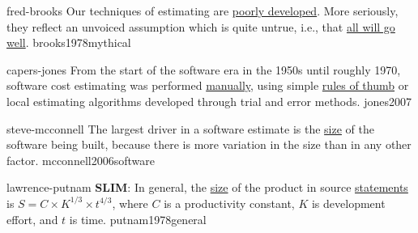 \documentclass{article}
\begin{document}


\lnQuote
  {fred-brooks}
  {Our techniques of estimating are \ul{poorly developed}. More seriously, they reflect an unvoiced assumption which is quite untrue, i.e., that \ul{all will go well}.}
  {brooks1978mythical}

\lnQuote
  {capers-jones}
  {From the start of the software era in the 1950s until roughly 1970, software cost estimating was performed \ul{manually}, using simple \ul{rules of thumb} or local estimating algorithms developed through trial and error methods.}
  {jones2007}

\lnQuote
  {steve-mcconnell}
  {The largest driver in a software estimate is the \ul{size} of the software being built, because there is more variation in the size than in any other factor.}
  {mcconnell2006software}


\lnQuote
  {lawrence-putnam}
  {\textbf{SLIM}: In general, the \ul{size} of the product in source \ul{statements} is \(S = C \times K^{1/3} \times t^{4/3}\), where \(C\) is a productivity constant, \(K\) is development effort, and \(t\) is time.}
  {putnam1978general}
\end{document}
